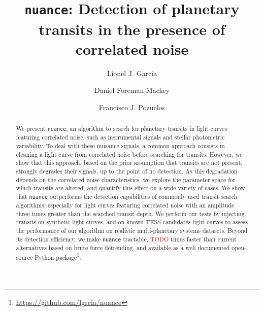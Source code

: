 \documentclass{aastex631}
\newcommand{\nuance}{\texttt{nuance}}
\newcommand{\TODO}{\textcolor{red}{TODO}}
\begin{document}
\title{\texttt{nuance}: Detection of planetary transits in the presence of correlated noise}

\author{Lionel J. Garcia}
\author{Daniel Foreman-Mackey}
\author{Francisco J. Pozuelos}


\begin{abstract}
    We present \nuance{}, an algorithm to search for planetary transits in light curves featuring correlated noise, such as instrumental signals and stellar photometric variability. To deal with these nuisance signals, a common approach consists in cleaning a light curve from correlated noise before searching for transits. However, we show that this approach, based on the prior assumption that transits are not present, strongly degrades their signals, up to the point of no detection. As this degradation depends on the correlated noise characteristics, we explore the parameter space for which transits are altered, and quantify this effect on a wide variety of cases. We show that \nuance{} outperforms the detection capabilities of commonly used transit search algorithms, especially for light curves featuring correlated noise with an amplitude three times greater than the searched transit depth. We perform our tests by injecting transits on synthetic light curves, and on known TESS candidates light curves to assess the performance of our algorithm on realistic multi-planetary systems datasets. Beyond its detection efficiency, we make \nuance{} tractable, \TODO{} times faster than current alternatives based on brute force detrending, and available as a well documented open-source Python package\footnote{\href{https://github.com/lgrcia/nuance}{https://github.com/lgrcia/nuance}}.
\end{abstract}

\end{document}
